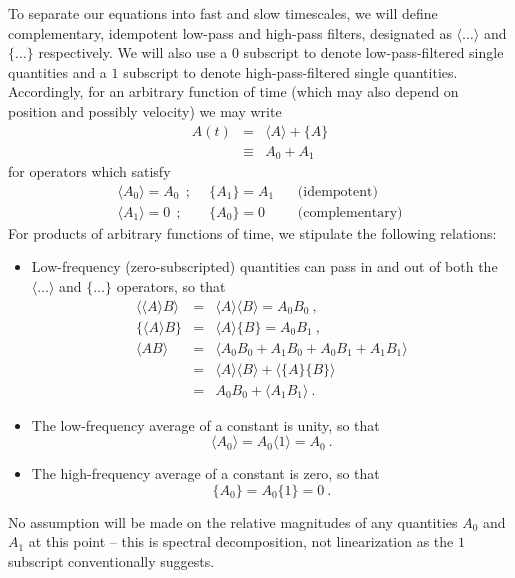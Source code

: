 To separate our equations into fast and slow timescales, we will define complementary, idempotent low-pass
and high-pass filters, designated as $\langle \ldots \rangle$ and $\{ \ldots \}$ respectively.
We will also use a $0$ subscript to denote low-pass-filtered single quantities and a $1$ subscript to
denote high-pass-filtered single quantities.  Accordingly, for an arbitrary function of time (which may
also depend on position and possibly velocity) we may write
\begin{eqnarray}
A(t) & = & \langle A \rangle + \{ A \} \nonumber \\
     & \equiv & A_{0} + A_{1} 
\end{eqnarray}
for operators which satisfy
\begin{eqnarray}
\langle A_{0} \rangle = A_{0} ~~;&~~ \{ A_{1} \} = A_{1} ~~&~~ \mbox{(idempotent)} \\
\langle A_{1} \rangle = 0 ~~;&~~ \{ A_{0} \} = 0 ~~&~~ \mbox{(complementary)}
\end{eqnarray} 
For products of arbitrary functions of time, we stipulate the following relations:
\begin{itemize}
\item Low-frequency (zero-subscripted) quantities can pass in and out of both the $\langle \ldots \rangle$ and $\{ \ldots \}$ operators, so that 
\begin{eqnarray}
\langle \langle A \rangle B \rangle & = & \langle A \rangle \langle B \rangle = A_{0} B_{0} ~,\\
\{ \langle A \rangle B \} & = & \langle A \rangle \{ B \} = A_{0} B_{1} ~, \\
\langle A B \rangle & = & \langle A_{0} B_{0} + A_{1} B_{0} + A_{0} B_{1} + A_{1} B_{1} \rangle \nonumber \\ 
& = & \langle A \rangle \langle B \rangle + \langle \{A\} \{B\} \rangle \nonumber \\
& = & A_{0} B_{0} + \langle A_{1} B_{1} \rangle ~.
\end{eqnarray}
\item The low-frequency average of a constant is unity, so that 
\begin{equation}
\langle A_{0} \rangle = A_{0} \langle 1 \rangle = A_{0} ~.
\end{equation}
\item The high-frequency average of a constant is zero, so that
\begin{equation}
\{ A_{0} \} = A_{0} \{ 1 \} = 0 ~.
\end{equation}
\end{itemize}
No assumption will be made on the relative magnitudes of any quantities $A_{0}$ and $A_{1}$
at this point -- this is spectral decomposition, not linearization as the $1$ subscript
conventionally suggests.

